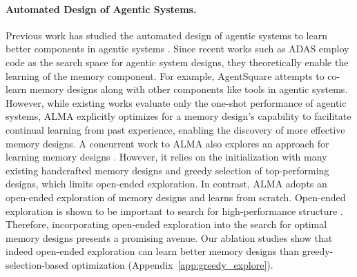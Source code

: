 \documentclass{article}
\theoremstyle{plain}
\theoremstyle{definition}
\theoremstyle{remark}
\newcommand{\ouralgo}{ALMA\xspace} %
\begin{document}
\paragraph{Automated Design of Agentic Systems.}
Previous work has studied the automated design of agentic systems to learn better components in agentic systems \citep{ hu2024ADAS,Zhang2025aflow,zhou2024symbolic,yin2025godel,zhuge24a, rosser2025agentbreeder, zhang2025multiagent, Yu2025AgentSquare, zhang2025swarmagentic, zhang2025multiagent, ye2025masgpt, zhang2025darwin}. Since recent works such as ADAS \citep{hu2024ADAS} employ code as the search space for agentic system designs, they theoretically enable the learning of the memory component. For example, AgentSquare \citep{Yu2025AgentSquare} attempts to co-learn memory designs along with other components like tools in agentic systems.  
However, while existing works evaluate only the one-shot performance of agentic systems, \ouralgo explicitly optimizes for a memory design's capability to facilitate continual learning from past experience, enabling the discovery of more effective memory designs.
A concurrent work to \ouralgo also explores an approach for learning memory designs \citep{zhang2025memevolve}. However, it relies on the initialization with many existing handcrafted memory designs and greedy selection of top-performing designs, which limits open-ended exploration. 
In contrast, \ouralgo adopts an open-ended exploration of memory designs and learns from scratch. Open-ended exploration is shown to be important to search for high-performance structure \citep{Joel2008Exploiting,Lehman2011Evolutionary,Lehman2011Evolving,Conti2018Improving, Stanley2019Why}. Therefore, incorporating open-ended exploration into the search for optimal memory designs presents a promising avenue. Our ablation studies show that indeed open-ended exploration can learn better memory designs than greedy-selection-based optimization (Appendix~\ref{app:greedy_explore}).
\end{document}
